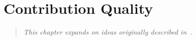 \chapter{Contribution Quality}
\label{ch:editquality}

\begin{quote}
\textit{
This chapter expands on ideas originally
described in~\cite{Adler2007}.}
\end{quote}










